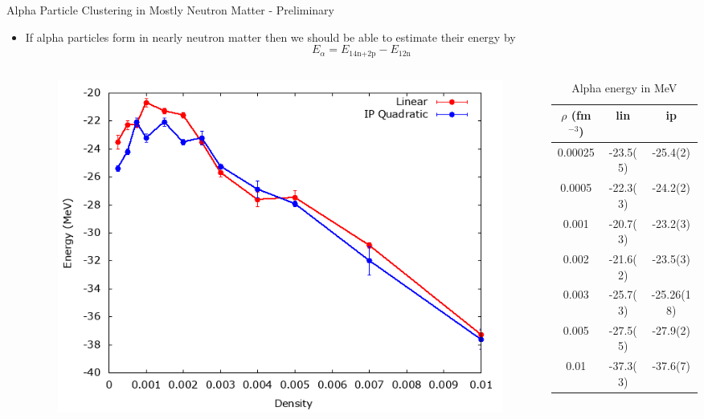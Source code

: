 \documentclass{beamer}
\begin{document}
\begin{frame}{\large Alpha Particle Clustering in Mostly Neutron Matter - Preliminary}
\begin{itemize}
   \item If alpha particles form in nearly neutron matter then we should be able to estimate their energy by
   \begin{equation*}
      E_\alpha = E_\text{14n+2p} - E_\text{12n}
   \end{equation*}
   \vspace{-0.25cm}
   \begin{columns}
   \begin{column}{0.6\textwidth}
   \begin{figure}[h]
      \centering
      \includegraphics[width=\textwidth]{figures/alpha.png}
   \end{figure}
   \end{column}
   \hspace{-0.6cm}
   \begin{column}{0.4\textwidth}
   \begin{table}[h!]
      \footnotesize
      \centering
      \caption{Alpha energy in MeV}
      \begin{tabular}{ccc}
         \hline \hline
         $\rho$ (fm$^{-3}$) & lin & ip \\
         \hline
         0.00025  & -23.5(5)  & -25.4(2)  \\
         0.0005   & -22.3(3)  & -24.2(2)  \\  
         0.001    & -20.7(3)  & -23.2(3)  \\  
         0.002    & -21.6(2)  & -23.5(3)  \\  
         0.003    & -25.7(3)  & -25.26(18)\\
         0.005    & -27.5(5)  & -27.9(2)  \\  
         0.01     & -37.3(3)  & -37.6(7)  \\  
         \hline \hline
      \end{tabular}
   \end{table}
   \end{column}
   \hspace{0.6cm}
   \end{columns}
\end{itemize}
\end{frame}
\end{document}
